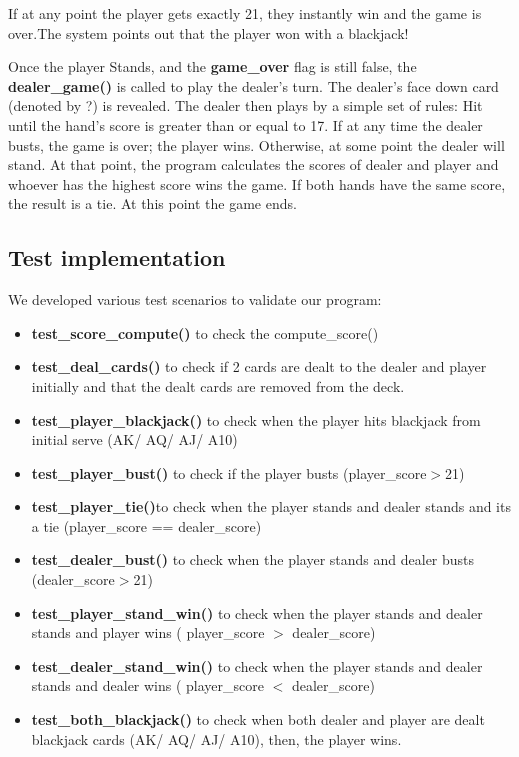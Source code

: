 \documentclass[12pt]{article}
\begin{document}
If at any point the player gets exactly 21, they instantly win and the game is over.The system points out that the player won with a blackjack!

Once the player Stands, and the \textbf{game\_over} flag is still false, the \textbf{dealer\_game()} is called to play the dealer's turn. The dealer's face down card (denoted by ?) is revealed. The dealer then plays by a simple set of rules: Hit until the hand's score is greater than or equal to 17. If at any time the dealer busts, the game is over; the player wins. Otherwise, at some point the dealer will stand. At that point, the program calculates the scores of dealer and player and whoever has the highest score wins the game. If both hands have the same score, the result is a tie. At this point the game ends.

\subsection{Test implementation}

We developed various test scenarios to validate our program:
\begin{itemize}
    \item \textbf{test\_score\_compute()} to check the compute\_score()
    \item \textbf{test\_deal\_cards()} to check if 2 cards are dealt to the dealer and player initially and that the dealt cards are removed from the deck.
    \item \textbf{test\_player\_blackjack()} to check when the player hits blackjack from initial serve (AK/ AQ/ AJ/ A10)
    \item \textbf{test\_player\_bust()} to check if the player busts (player\_score$>$21)
    \item  \textbf{test\_player\_tie()}to check when the player stands and dealer stands and its a tie (player\_score == dealer\_score)
    \item \textbf{test\_dealer\_bust()} to check when the player stands and dealer busts (dealer\_score$>$21)
    \item \textbf{test\_player\_stand\_win()} to check when the player stands and dealer stands and player wins ( player\_score $>$ dealer\_score)
    \item \textbf{test\_dealer\_stand\_win()} to check when the player stands and dealer stands and dealer wins ( player\_score $<$ dealer\_score)
    \item \textbf{test\_both\_blackjack()} to check when both dealer and player are dealt blackjack cards (AK/ AQ/ AJ/ A10), then, the player wins.
\end{itemize}
\end{document}
